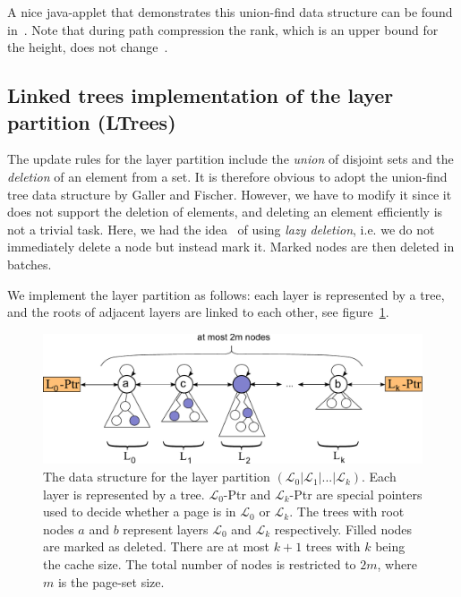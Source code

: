 \documentclass[a4paper,12pt, titlepage]{article}  %
\newcommand{\cl}{\mathcal{L}}   %
\begin{document}
\noindent A nice java-applet that demonstrates this union-find data structure can be found in~\cite{gallerFischer_javaApplet}.
Note that during path compression the rank, which is an upper bound for the height, does not change~\cite{brPreiss_onlineBook}.

\subsection{Linked trees implementation of the layer partition (LTrees)}
The update rules for the layer partition include the \emph{union} of disjoint sets and
the \emph{deletion} of an element from a set. It is therefore obvious to adopt the 
union-find tree data structure by Galler and Fischer. However, we have to modify it 
since it does not support the deletion of elements, and deleting an element efficiently is not a trivial task.
Here, we had the idea~\cite{andrei_idea} of using \emph{lazy deletion}, i.e. we do not immediately
delete a node but instead mark it. Marked nodes are then deleted in batches. 

We implement the layer partition as follows: each layer is represented by a tree, and the roots 
of adjacent layers are linked to each other, see figure~\ref{fig:layerPartitionTrees2}.

\begin{figure}[ht]
	\centering
	\includegraphics[scale=0.5]{./figures/layerPartitionTrees2.pdf}
	\caption{The data structure for the layer partition $(\cl_0 | \cl_1 | ... | \cl_k)$.
					Each layer is represented by a tree. 
	         $\cl_0$-Ptr and $\cl_k$-Ptr are special 
	         pointers used to decide whether a page is in $\cl_0$ or $\cl_k$. The trees 
	         with root nodes $a$ and $b$ represent layers $\cl_0$ and $\cl_k$ respectively. 
	         Filled nodes are marked as deleted. There are at most $k+1$ trees with $k$ being the cache size. The total number of nodes
	         is restricted to $2m$, where $m$ is the page-set size.}
	\label{fig:layerPartitionTrees2}
\end{figure}
\end{document}
